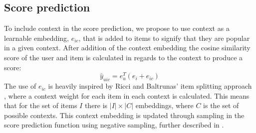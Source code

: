 \subsection{Score prediction}\label{subsec:csgcn_is_score_prediction}
To include context in the score prediction, we propose to use context as a learnable embedding, $e_{ic}$, that is added to items to signify that they are popular in a given context.
After addition of the context embedding the cosine similarity score of the user and item is calculated in regards to the context to produce a score: 
$$\hat{y}_{uic} = e_u^T(e_i+e_{ic})$$
The use of $e_{ic}$ is heavily inspired by Ricci and Baltrunas' item splitting approach \cite{baltrunasitemsplitting}, where a context weight for each item in each context is calculated.
This means that for the set of items $I$ there is $|I| \times |C|$ embeddings, where $C$ is the set of possible contexts.
This context embedding is updated through sampling in the score prediction function using negative sampling, further described in .

